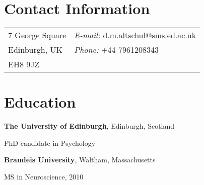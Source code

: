 \documentclass[margin,line]{res}
\newenvironment{list1}{
  \begin{list}{\ding{113}}{%
      \setlength{\itemsep}{0in}
      \setlength{\parsep}{0in} \setlength{\parskip}{0in}
      \setlength{\topsep}{0in} \setlength{\partopsep}{0in} 
      \setlength{\leftmargin}{0.17in}}}{\end{list}}
\begin{document}

\begin{resume}
\section{\sc Contact Information}
\vspace{.05in}
\begin{tabular}{@{}p{3in}p{4in}}
7 George Square  & {\it E-mail:}  d.m.altschul@sms.ed.ac.uk\\            
Edinburgh, UK & {\it Phone:} +44 7961208343 \\    
EH8 9JZ \\
\end{tabular}



\section{\sc Education}

{\bf The University of Edinburgh}, Edinburgh, Scotland\\
\vspace*{-.1in}
\begin{list1}
\item[] PhD candidate in Psychology
\vspace*{.05in}
\end{list1}

{\bf Brandeis University}, Waltham, Massachusetts\\
\vspace*{-.1in}
\begin{list1}
\item[] MS in Neuroscience, 2010
\vspace*{.05in}
\end{list1}


\end{resume}
\end{document}
